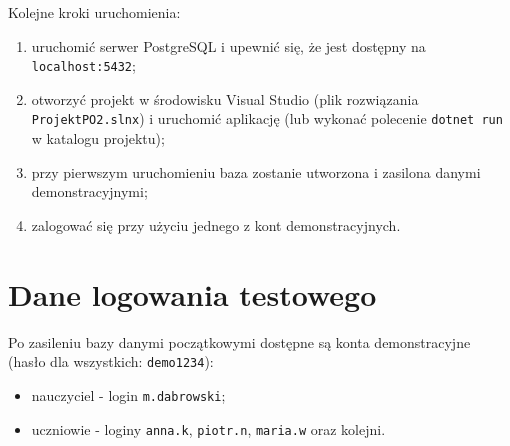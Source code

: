Kolejne kroki uruchomienia:

\begin{enumerate}
  \item uruchomić serwer PostgreSQL i upewnić się, że jest dostępny na \texttt{localhost:5432};
  \item otworzyć projekt w środowisku Visual Studio (plik rozwiązania \texttt{ProjektPO2.slnx})
        i uruchomić aplikację (lub wykonać polecenie \texttt{dotnet run} w katalogu projektu);
  \item przy pierwszym uruchomieniu baza zostanie utworzona i zasilona danymi demonstracyjnymi;
  \item zalogować się przy użyciu jednego z kont demonstracyjnych.
\end{enumerate}

\section{Dane logowania testowego}
\label{sec:daneLogowania}

Po zasileniu bazy danymi początkowymi dostępne są konta demonstracyjne (hasło dla wszystkich:
\texttt{demo1234}):

\begin{itemize}
  \item nauczyciel - login \texttt{m.dabrowski};
  \item uczniowie - loginy \texttt{anna.k}, \texttt{piotr.n}, \texttt{maria.w} oraz kolejni.
\end{itemize}
